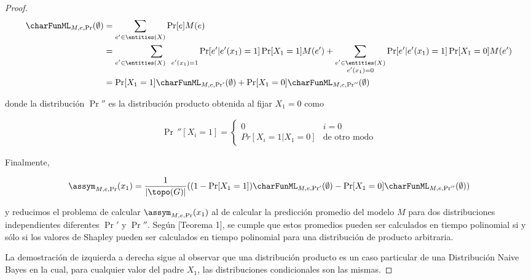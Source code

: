 \begin{proof}
    \begin{align*}
        \charFunML_{M,e,\Pr}(\emptyset) &= \sum_{e' \in \entities(X)} \Pr[e] M(e)\\
        &= \sum_{\substack{e' \in \entities(X) \
        \ e'(x_1) = 1}} \Pr[e' | e'(x_1) = 1] \Pr[X_1 = 1] M (e') + \sum_{\substack{e' \in \entities(X) \\ e'(x_1) = 0}} \Pr[e' | e'(x_1) = 1] \Pr[X_1 = 0] M (e')\\
        &= \Pr[X_1 = 1] \charFunML_{M,e,\Pr'}(\emptyset) + \Pr[X_1 = 0] \charFunML_{M,e,\Pr''}(\emptyset)
    \end{align*}
    
    donde la distribución $\Pr''$ es la distribución producto obtenida al fijar $X_1 = 0$ como
    
    \begin{align*}
        \Pr \, ''[X_i = 1] = \begin{cases}
            0 & i = 0\\
            Pr[X_i = 1 | X_1 = 0] & \text{de otro modo}
        \end{cases}
    \end{align*}
    
    Finalmente,
    
    \begin{align*}
        \assym_{M,e,\Pr}(x_1) = \frac{1}{|\topo(G)|}( (1 - \Pr[X_1 = 1]) \charFunML_{M,e,\Pr'}(\emptyset) - \Pr[X_1 = 0] \charFunML_{M,e,\Pr''}(\emptyset))
    \end{align*}
    
    y reducimos el problema de calcular $\assym_{M,e,\Pr}(x_1)$ al de calcular la predicción promedio del modelo $M$ para dos distribuciones independientes diferentes $\Pr'$ y $\Pr''$. Según \cite{van2022tractability}[Teorema 1], se cumple que estos promedios pueden ser calculados en tiempo polinomial si y sólo si los valores de Shapley pueden ser calculados en tiempo polinomial para una distribución de producto arbitraria.
    
    La demostración de izquierda a derecha sigue al observar que una distribución producto es un caso particular de una Distribución Naive Bayes en la cual, para cualquier valor del padre $X_1$, las distribuciones condicionales son las mismas.

        
    \end{proof}

